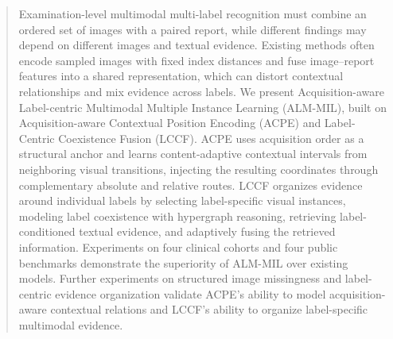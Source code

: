 \begin{abstract}
Examination-level multimodal multi-label recognition must combine an ordered
set of images with a paired report, while different findings may depend on
different images and textual evidence. Existing methods often encode sampled
images with fixed index distances and fuse image--report features into a shared
representation, which can distort contextual relationships and mix evidence
across labels. We present Acquisition-aware Label-centric Multimodal Multiple
Instance Learning (ALM-MIL), built on Acquisition-aware Contextual Position
Encoding (ACPE) and Label-Centric Coexistence Fusion (LCCF). ACPE uses
acquisition order as a structural anchor and learns content-adaptive contextual
intervals from neighboring visual transitions, injecting the resulting
coordinates through complementary absolute and relative routes. LCCF organizes
evidence around individual labels by selecting label-specific visual instances,
modeling label coexistence with hypergraph reasoning, retrieving
label-conditioned textual evidence, and adaptively fusing the retrieved
information. Experiments on four clinical cohorts and four public benchmarks
demonstrate the superiority of ALM-MIL over existing models. Further
experiments on structured image missingness and
label-centric evidence organization validate ACPE's ability to model
acquisition-aware contextual relations and LCCF's ability to organize
label-specific multimodal evidence.

\end{abstract}
